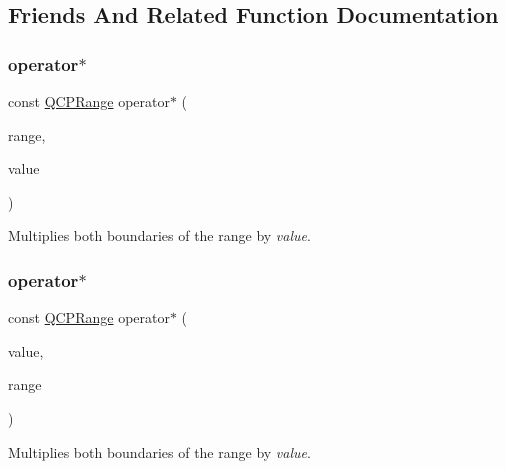 \subsection{Friends And Related Function Documentation}
\hypertarget{class_q_c_p_range_a558b1248ff6a9e41fd5b2630555a8acc}{}\label{class_q_c_p_range_a558b1248ff6a9e41fd5b2630555a8acc} 
\subsubsection{\texorpdfstring{operator$\ast$}{operator*}\hspace{0.1cm}{\footnotesize\ttfamily [1/2]}}
{\footnotesize\ttfamily const \hyperlink{class_q_c_p_range}{Q\+C\+P\+Range} operator$\ast$ (\begin{DoxyParamCaption}\item[{const \hyperlink{class_q_c_p_range}{Q\+C\+P\+Range} \&}]{range,  }\item[{double}]{value }\end{DoxyParamCaption})\hspace{0.3cm}{\ttfamily [friend]}}

Multiplies both boundaries of the range by {\itshape value}. \hypertarget{class_q_c_p_range_a5cb2332f6957021f47cc768089f4f090}{}\label{class_q_c_p_range_a5cb2332f6957021f47cc768089f4f090} 
\subsubsection{\texorpdfstring{operator$\ast$}{operator*}\hspace{0.1cm}{\footnotesize\ttfamily [2/2]}}
{\footnotesize\ttfamily const \hyperlink{class_q_c_p_range}{Q\+C\+P\+Range} operator$\ast$ (\begin{DoxyParamCaption}\item[{double}]{value,  }\item[{const \hyperlink{class_q_c_p_range}{Q\+C\+P\+Range} \&}]{range }\end{DoxyParamCaption})\hspace{0.3cm}{\ttfamily [friend]}}

Multiplies both boundaries of the range by {\itshape value}. \hypertarget{class_q_c_p_range_af53ea6fb823a4a5897162b865841de04}{}\label{class_q_c_p_range_af53ea6fb823a4a5897162b865841de04} 
